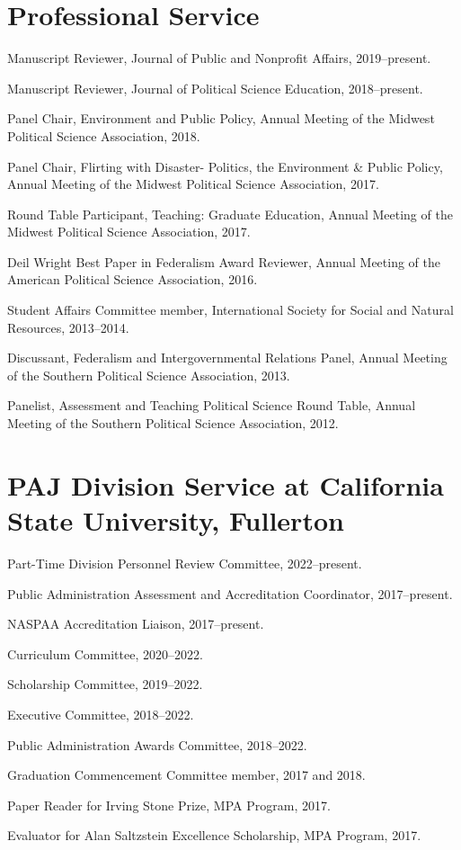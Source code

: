 \documentclass[11pt,letterpaper]{article}
\renewenvironment{itemize}{
  \begin{list}{}{
    \setlength{\leftmargin}{1.5em}
    \setlength{\itemsep}{0.25em}
    \setlength{\parskip}{0pt}
    \setlength{\parsep}{0.25em}
  }
}{
  \end{list}
}
\begin{document}
\section*{Professional Service}
\begin{itemize}\leftmargin=2pt\itemindent=-15pt
	\item Manuscript Reviewer, Journal of Public and Nonprofit Affairs, 2019--present.
	\item Manuscript Reviewer, Journal of Political Science Education, 2018--present.
	\item Panel Chair, Environment and Public Policy, Annual Meeting of the Midwest Political Science Association, 2018.
	\item Panel Chair, Flirting with Disaster- Politics, the Environment \& Public Policy, Annual Meeting of the Midwest Political Science Association, 2017. 
	\item Round Table Participant, Teaching: Graduate Education, Annual Meeting of the Midwest Political Science Association, 2017.
	\item Deil Wright Best Paper in Federalism Award Reviewer, Annual Meeting of the American Political Science Association, 2016.
	\item Student Affairs Committee member, International Society for Social and Natural Resources, 2013--2014.
	\item Discussant, Federalism and Intergovernmental Relations Panel, Annual Meeting of the Southern Political Science Association, 2013.
	\item Panelist, Assessment and Teaching Political Science Round Table, Annual Meeting of the Southern Political Science Association, 2012.
\end{itemize}

\section*{PAJ Division Service at California State University, Fullerton}
	\begin{itemize}
		\item Part-Time Division Personnel Review Committee, 2022--present. 
		\item Public Administration Assessment and Accreditation Coordinator, 2017--present.
		\item NASPAA Accreditation Liaison, 2017--present.
		\item Curriculum Committee, 2020--2022.
		\item Scholarship Committee, 2019--2022.
		\item Executive Committee, 2018--2022. 
		\item Public Administration Awards Committee, 2018--2022. 
		\item Graduation Commencement Committee member, 2017 and 2018.
		\item Paper Reader for Irving Stone Prize, MPA Program, 2017.
		\item Evaluator for Alan Saltzstein Excellence Scholarship, MPA Program, 2017. 
	\end{itemize}
\end{document}
